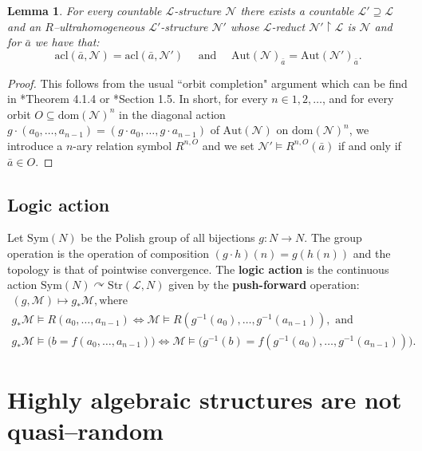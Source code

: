 \documentclass[11pt]{amsart}
\theoremstyle{plain}
\newtheorem{lemma}[theorem]{Lemma}
\theoremstyle{definition}
\begin{document}
\begin{lemma}\label{L:Ultrahomogeneous}
For every countable $\mathcal{L}$-structure $\mathcal{N}$ there exists a countable  $\mathcal{L}'\supseteq \mathcal{L}$ and an  $R$--ultrahomogeneous $\mathcal{L}'$-structure $\mathcal{N}'$ whose $\mathcal{L}$-reduct $\mathcal{N}'\upharpoonright \mathcal{L}$ is $\mathcal{N}$ and for  $\bar{a}$ we have that:
\[\mathrm{acl}(\bar{a},\mathcal{N})=\mathrm{acl}(\bar{a},\mathcal{N}')\quad \text{ and }\quad  \mathrm{Aut}(\mathcal{N})_{\bar{a}}=\mathrm{Aut}(\mathcal{N}')_{\bar{a}}.\]
\end{lemma}
\begin{proof} This follows from the usual ``orbit completion" argument which can be find in \cite{Hodges}*{Theorem 4.1.4} or \cite{BK96}*{Section 1.5}. In short, for every $n\in 1,2,\ldots$, and for every orbit $O\subseteq \mathrm{dom}(\mathcal{N})^n$ in the diagonal action $g\cdot(a_0,\ldots,a_{n-1})=(g\cdot a_0,\ldots,g\cdot a_{n-1})$ of $\mathrm{Aut}(\mathcal{N})$ on $\mathrm{dom}(\mathcal{N})^n$, we introduce a $n$-ary relation symbol $R^{n,O}$ and we set $\mathcal{N}'\models R^{n,O}(\bar{a})$ if and only if $\bar{a}\in O$.  
\end{proof}


\subsection{Logic action}\label{SS:Background:2}
Let $\mathrm{Sym}(N)$ be the Polish group of all bijections $g\colon N\to N$. The group operation is the operation of composition $(g\cdot h)(n)=g(h(n))$ and the topology is that of pointwise convergence. The {\bf logic action} is the  continuous action $\mathrm{Sym}(N)\curvearrowright \mathrm{Str}(\mathcal{L},N)$ given by the {\bf push-forward} operation: 
\begin{gather*}
    (g,\mathcal{M})\mapsto g_* \mathcal{M}, \text{where}\\
    g_*\mathcal{M}\models R(a_0,\ldots,a_{n-1}) \iff \mathcal{M}\models R(g^{-1}(a_0),\ldots,g^{-1}(a_{n-1})), \text{ and}\\
    g_*\mathcal{M}\models \big(b=f(a_0,\ldots,a_{n-1}) \big)\iff \mathcal{M}\models \big(g^{-1}(b) =f(g^{-1}(a_0),\ldots,g^{-1}(a_{n-1}))\big).
\end{gather*}

\section{Highly algebraic structures are not quasi--random}
\end{document}
